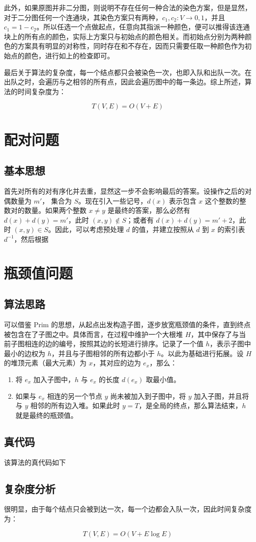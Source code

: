 \documentclass[UTF8]{ctexart}
\begin{document}
        此外，如果原图并非二分图，则说明不存在任何一种合法的染色方案，但是显然，对于二分图任何一个连通块，其染色方案只有两种，$c_1, c_2 : V\to {0, 1}$，并且 $c_1 = 1-c_2$。所以任选一个点做起点，任意向其指派一种颜色，便可以推得该连通块上的所有点的颜色，实际上方案只与初始点的颜色相关。而初始点分别为两种颜色的方案具有明显的对称性，同时存在和不存在，因而只需要任取一种颜色作为初始点的颜色，进行如上的检查即可。

        最后关于算法的复杂度，每一个结点都只会被染色一次，也即入队和出队一次。在出队之时，会遍历与之相邻的所有点，因此会遍历图中的每一条边。综上所述，算法的时间复杂度为：

        $$T(V, E) = O(V + E)$$

\section{配对问题}

    \subsection{基本思想}

    首先对所有的对有序化并去重，显然这一步不会影响最后的答案。设操作之后的对偶数量为 $m'$， 集合为 $S$。现在引入一些记号，$d(x)$ 表示包含 $x$ 这个整数的整数对的数量。如果两个整数 $x\neq y$ 是最终的答案，那么必然有 $d(x) + d(y) = m'$，此时 $(x, y)\notin S$；或者有 $d(x) + d(y) = m' + 2$，此时 $(x, y)\in S$。因此，可以考虑预处理 $d$ 的值，并建立按照从 $d$ 到 $x$ 的索引表 $d^{-1}$，然后根据

\section{瓶颈值问题}

    \subsection{算法思路}

    可以借鉴 Prim 的思想，从起点出发构造子图，逐步放宽瓶颈值的条件，直到终点被包含在了子图之中。具体而言，在过程中维护一个大根堆 $H$，其中保存了与当前子图相连的边的编号，按照其边的长短进行排序。记录了一个值 $h$，表示子图中最小的边权为 $h$，并且与子图相邻的所有边都小于 $h$。以此为基础进行拓展。设 $H$ 的堆顶元素（最大元素）为 $x$，其对应的边为 $e_x$，那么：

    \begin{enumerate}
        \item 将 $e_x$ 加入子图中，$h$ 与 $e_x$ 的长度 $d(e_x)$ 取最小值。
        \item 如果与 $e_x$ 相连的另一个节点 $y$ 尚未被加入到子图中，将 $y$ 加入子图，并且将与 $y$ 相邻的所有边入堆。如果此时 $y=T$，是全局的终点，那么算法结束，$h$ 就是最终的瓶颈值。
    \end{enumerate}

    \subsection{真代码}

    该算法的真代码如下 

    \subsection{复杂度分析}

    很明显，由于每个结点只会被到达一次，每一个边都会入队一次，因此时间复杂度为：

    $$T(V, E) = O(V + E\log E)$$
\end{document}
